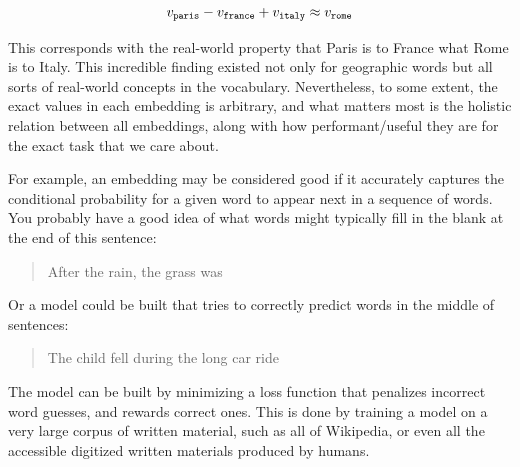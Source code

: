\begin{eqnarray}
  v_{\tt paris} - v_{\tt france} + v_{\tt italy} \approx v_{\tt rome}
\end{eqnarray}

This corresponds with the real-world property that Paris is to France what Rome is to Italy. This incredible finding existed not only for geographic words but all sorts of real-world concepts in the vocabulary. Nevertheless, to some extent, the exact values in each embedding is arbitrary, and what matters most is the holistic relation between all embeddings, along with how performant/useful they are for the exact task that we care about.








For example, an embedding may be considered good if it accurately captures the conditional probability for a given word to appear next in a sequence of words.  You probably have a good idea of what words might typically fill in the blank at the end of this sentence:
\begin{quote}
  After the rain, the grass was \underline{\hspace*{12ex}}
\end{quote}
Or a model could be built that tries to correctly predict words in the middle of sentences:
\begin{quote}
  The child fell \underline{\hspace*{12ex}} during the long car ride
\end{quote}
The model can be built by minimizing a loss function that penalizes incorrect word guesses, and rewards correct ones. This is done by training a model on a very large corpus of written material, such as all of Wikipedia, or even all the accessible digitized written materials produced by humans.

